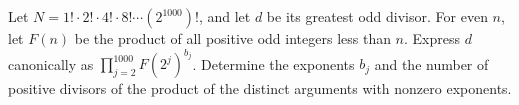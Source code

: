 Let $N=1!\cdot2!\cdot4!\cdot8!\cdots(2^{1000})!$, and let $d$ be its greatest odd divisor. For even $n$, let $F(n)$ be the product of all positive odd integers less than $n$. Express $d$ canonically as $\prod_{j=2}^{1000}F(2^j)^{b_j}$. Determine the exponents $b_j$ and the number of positive divisors of the product of the distinct arguments with nonzero exponents.
